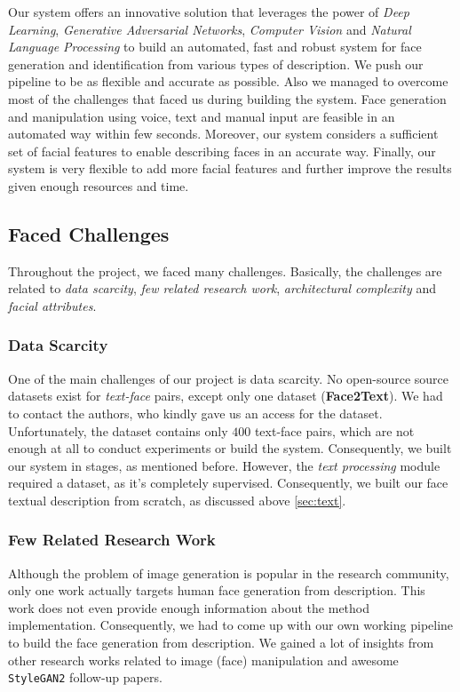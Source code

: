 Our system offers an innovative solution that leverages the power of \emph{Deep Learning}, \emph{Generative Adversarial Networks}, \emph{Computer Vision} and \emph{Natural Language Processing} to build an automated, fast and robust system for face generation and identification from various types of description. We push our pipeline to be as flexible and accurate as possible. Also we managed to overcome most of the challenges that faced us during building the system. Face generation and manipulation using voice, text and manual input are feasible in an automated way within few seconds. Moreover, our system considers a sufficient set of facial features to enable describing faces in an accurate way. Finally, our system is very flexible to add more facial features and further improve the results given enough resources and time.

\subsection{Faced Challenges}
Throughout the project, we faced many challenges. Basically, the challenges are related to \emph{data scarcity}, \emph{few related research work}, \emph{architectural complexity} and \emph{facial attributes}.

\subsubsection{Data Scarcity}
One of the main challenges of our project is data scarcity. No open-source source datasets exist for \emph{text-face} pairs, except only one dataset (\textbf{Face2Text}). We had to contact the authors, who kindly gave us an access for the dataset. Unfortunately, the dataset contains only $400$ text-face pairs, which are not enough at all to conduct experiments or build the system. Consequently, we built our system in stages, as mentioned before. However, the \emph{text processing} module required a dataset, as it's completely supervised. Consequently, we built our face textual description from scratch, as discussed above \ref{sec:text}.

\subsubsection{Few Related Research Work}
Although the problem of image generation is popular in the research community, only one work actually targets human face generation from description. This work \cite{wang2020faces} does not even provide enough information about the method implementation. Consequently, we had to come up with our own working pipeline to build the face generation from description. We gained a lot of insights from other research works related to image (face) manipulation and awesome \texttt{StyleGAN2} follow-up papers.

